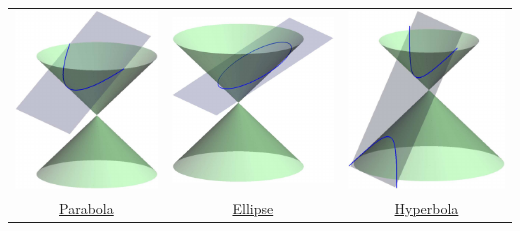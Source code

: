 \begin{center}
\begin{tabular}{c@{\qquad\qquad}c@{\qquad}c}
\includegraphics[scale=1.1]{conicparabola_0}
&
\includegraphics[scale=1.1]{conicellipse_0}
&
\includegraphics[scale=1.1]{conichyperbola_0}
\\
\href{http://www.math.uci.edu/~ndonalds/math8/conicparabola2.html}{Parabola}
&
\href{http://www.math.uci.edu/~ndonalds/math8/conicellipse2.html}{Ellipse}\phantom{bobob}
&
\href{http://www.math.uci.edu/~ndonalds/math8/conichyperbola2.html}{Hyperbola}
\end{tabular}
\end{center}


